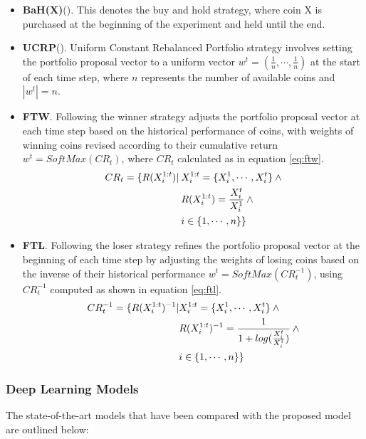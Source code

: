 \begin{itemize}
	\item \textbf{BaH(X)}(\citet{li2014online}). This denotes the buy and hold strategy, where coin X is purchased at the beginning of the experiment and held until the end.
	\item \textbf{UCRP}(\citet{li2014online}). Uniform Constant Rebalanced Portfolio strategy involves setting the portfolio proposal vector to a uniform vector $w^t=(\frac{1}{n}, \cdots, \frac{1}{n})$ at the start of each time step, where $n$ represents the number of available coins and $|w^t| = n$.	
	\item \textbf{FTW}. Following the winner strategy adjusts the portfolio proposal vector at each time step based on the historical performance of coins, with weights of winning coins revised according to their cumulative return $w^t = SoftMax(CR_t)$, where $CR_t$ calculated as in equation \eqref{eq:ftw}.
	\begin{align}
		CR_t = \{R(X_i^{1:t})| \> &X_i^{1:t} = \{X_i^1, \cdots, X_i^t\} \> \land  \notag \\ 
		&R(X_i^{1:t}) = \frac{X_i^t}{X_i^1} \> \land \notag \\ 
		&i \in \{1, \cdots, n\}\}
		\label{eq:ftw}
	\end{align}

	\item \textbf{FTL}. Following the loser strategy refines the portfolio proposal vector at the beginning of each time step by adjusting the weights of losing coins based on the inverse of their historical performance $w^t = SoftMax(CR_t^{-1})$, using $CR_t^{-1}$ computed as shown in equation \eqref{eq:ftl}.
	\begin{align}
	CR_t^{-1} = \{R(X_i^{1:t})^{-1} | &X_i^{1:t} = \{X_i^1, \cdots, X_i^t\} \> \land \notag\\ 
	&R(X_i^{1:t})^{-1} = \frac{1}{1 + log(\frac{X_i^t}{X_i^1})} \> \land \notag \\  
	&i \in \{1, \cdots, n\} \}
	\label{eq:ftl}
	\end{align}
\end{itemize}

\subsubsection{Deep Learning Models}
The state-of-the-art models that have been compared with the proposed model are outlined below:

